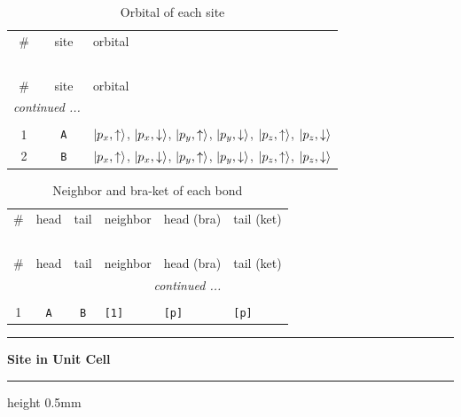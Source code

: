 \documentclass[fleqn,10pt,landscape]{jsarticle}
\begin{document}
\renewcommand{\arraystretch}{1.6}
\begin{longtable}[l]{ccl}
\captionsetup{justification=raggedright, singlelinecheck=off}
\caption{Orbital of each site}
 \\
 \hline \hline
\# & site & orbital \\ \hline \endfirsthead

\multicolumn{2}{l}{\tablename\ \thetable{}} \\
 \hline \hline
\# & site & orbital \\ \hline \endhead

 \hline \hline
\multicolumn{2}{r}{\footnotesize\it continued ...} \\ \endfoot

 \hline \hline
\multicolumn{2}{r}{} \\ \endlastfoot

1 & \texttt{A} & $\ket{p_{x},\uparrow}$, $\ket{p_{x},\downarrow}$, $\ket{p_{y},\uparrow}$, $\ket{p_{y},\downarrow}$, $\ket{p_{z},\uparrow}$, $\ket{p_{z},\downarrow}$ \\ \hline
2 & \texttt{B} & $\ket{p_{x},\uparrow}$, $\ket{p_{x},\downarrow}$, $\ket{p_{y},\uparrow}$, $\ket{p_{y},\downarrow}$, $\ket{p_{z},\uparrow}$, $\ket{p_{z},\downarrow}$ \\
\end{longtable}
\renewcommand{\arraystretch}{1.6}
\begin{longtable}[l]{ccclll}
\captionsetup{justification=raggedright, singlelinecheck=off}
\caption{Neighbor and bra-ket of each bond}
 \\
 \hline \hline
\# & head & tail & neighbor & head (bra) & tail (ket) \\ \hline \endfirsthead

\multicolumn{5}{l}{\tablename\ \thetable{}} \\
 \hline \hline
\# & head & tail & neighbor & head (bra) & tail (ket) \\ \hline \endhead

 \hline \hline
\multicolumn{5}{r}{\footnotesize\it continued ...} \\ \endfoot

 \hline \hline
\multicolumn{5}{r}{} \\ \endlastfoot

1 & \texttt{A} & \texttt{B} & \texttt{[1]} & \texttt{[p]} & \texttt{[p]} \\
\end{longtable}
\vspace{5mm}
\noindent \rule[0.5mm]{5mm}{0.5mm}\hspace{3mm}\textbf{Site in Unit Cell}\hspace{3mm}\leaders\hrule height 0.5mm\hfill\kern0pt
\vspace{3mm}
\end{document}
